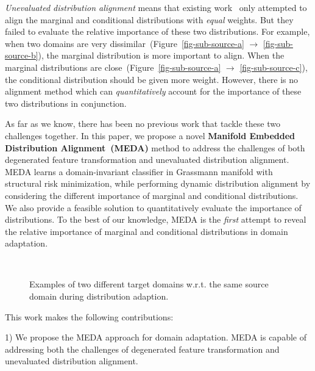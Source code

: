 \documentclass[sigconf]{acmart}
\begin{document}
\textit{Unevaluated distribution alignment} means that existing work~\cite{long2013transfer,hou2016unsupervised,zhang2017joint,tahmoresnezhad2016visual} only attempted to align the marginal and conditional distributions with \textit{equal} weights. But they failed to evaluate the relative importance of these two distributions. For example, when two domains are very dissimilar~(Figure~\ref{fig-sub-source-a} $\rightarrow$ \ref{fig-sub-source-b}), the marginal distribution is more important to align. When the marginal distributions are close~(Figure~\ref{fig-sub-source-a} $\rightarrow$ \ref{fig-sub-source-c}), the conditional distribution should be given more weight. However, there is no alignment method which can \textit{quantitatively} account for the importance of these two distributions in conjunction.

As far as we know, there has been no previous work that tackle these two challenges together. In this paper, we propose a novel \textbf{Manifold Embedded Distribution Alignment~(MEDA)} method to address the challenges of both degenerated feature transformation and unevaluated distribution alignment. MEDA learns a domain-invariant classifier in Grassmann manifold with structural risk minimization, while performing dynamic distribution alignment by considering the different importance of marginal and conditional distributions. We also provide a feasible solution to quantitatively evaluate the importance of distributions. To the best of our knowledge, MEDA is the \textit{first} attempt to reveal the relative importance of marginal and conditional distributions in domain adaptation.

\begin{figure}[t!]
	\centering
	\vspace{-.1in}
	~\vline
	~
	~
	\vspace{-.1in}
	\caption{Examples of two different target domains w.r.t. the same source domain during distribution adaption.}
	\label{fig-bda}
	\vspace{-.2in}
\end{figure}

This work makes the following contributions:

1) We propose the MEDA approach for domain adaptation. MEDA is capable of addressing both the challenges of degenerated feature transformation and unevaluated distribution alignment.
\end{document}
